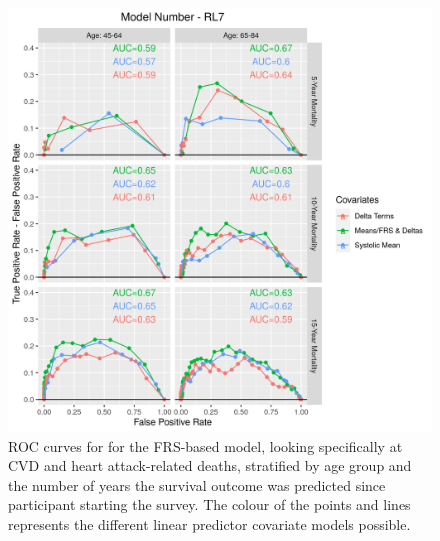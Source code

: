 \documentclass[
]{article}
\begin{document}
\begin{figure}
\centering
\includegraphics{./Rmarkdown_Plots/ROC_CAx-Covariates_EventType_RL7.png}
\caption{ROC curves for for the FRS-based model, looking specifically at CVD and heart attack-related deaths, stratified by age group and the number of years the survival outcome was predicted since participant starting the survey. The colour of the points and lines represents the different linear predictor covariate models possible.}\label{fig:ROC_RL7}
\end{figure}
\end{document}
